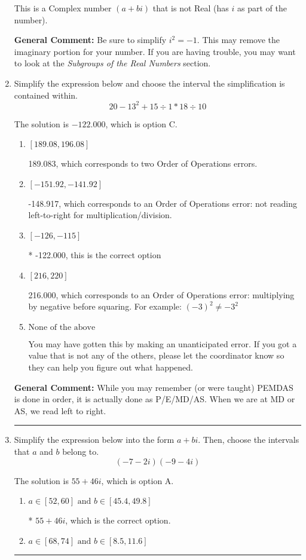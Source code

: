\documentclass{extbook}[14pt]
\newcommand{\litem}[1]{\item #1

\rule{\textwidth}{0.4pt}}
\begin{document}
\begin{enumerate}
{\begin{enumerate}[label=\Alph*.]
This is a Complex number $(a+bi)$ that is not Real (has $i$ as part of the number).
\end{enumerate}

\textbf{General Comment:} Be sure to simplify $i^2 = -1$. This may remove the imaginary portion for your number. If you are having trouble, you may want to look at the \textit{Subgroups of the Real Numbers} section.
}
\litem{
Simplify the expression below and choose the interval the simplification is contained within.
\[ 20 - 13^2 + 15 \div 1 * 18 \div 10 \]

The solution is \( -122.000 \), which is option C.\begin{enumerate}[label=\Alph*.]
\item \( [189.08, 196.08] \)

 189.083, which corresponds to two Order of Operations errors.
\item \( [-151.92, -141.92] \)

 -148.917, which corresponds to an Order of Operations error: not reading left-to-right for multiplication/division.
\item \( [-126, -115] \)

* -122.000, this is the correct option
\item \( [216, 220] \)

 216.000, which corresponds to an Order of Operations error: multiplying by negative before squaring. For example: $(-3)^2 \neq -3^2$
\item \( \text{None of the above} \)

 You may have gotten this by making an unanticipated error. If you got a value that is not any of the others, please let the coordinator know so they can help you figure out what happened.
\end{enumerate}

\textbf{General Comment:} While you may remember (or were taught) PEMDAS is done in order, it is actually done as P/E/MD/AS. When we are at MD or AS, we read left to right.
}
\litem{
Simplify the expression below into the form $a+bi$. Then, choose the intervals that $a$ and $b$ belong to.
\[ (-7 - 2 i)(-9 - 4 i) \]

The solution is \( 55 + 46 i \), which is option A.\begin{enumerate}[label=\Alph*.]
\item \( a \in [52, 60] \text{ and } b \in [45.4, 49.8] \)

* $55 + 46 i$, which is the correct option.
\item \( a \in [68, 74] \text{ and } b \in [8.5, 11.6] \)


\end{enumerate}}
\end{enumerate}
\end{document}
